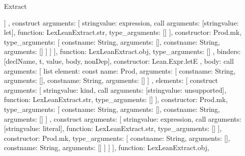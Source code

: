 \begin{lexlean}{Extract}
\begin{toolingmodule}
{{{{{{{                      ]
                    },
                    construct{
                      arguments: [
                        string{value: expression},
                        call{
                          arguments: [string{value: let}],
                          function: LexLeanExtract.str,
                          type_arguments: []
                        }
                      ],
                      constructor: Prod.mk,
                      type_arguments: [
                        const{name: String, arguments: []},
                        const{name: String, arguments: []}
                      ]
                    }
                  ]
                }
              ],
              function: LexLeanExtract.obj,
              type_arguments: []
            },
            binders: [declName, t, value, body, nonDep],
            constructor: Lean.Expr.letE
          },
          {
            body: call{
              arguments: [
                list{
                  element: const{
                    name: Prod,
                    arguments: [
                      const{name: String, arguments: []},
                      const{name: String, arguments: []}
                    ]
                  },
                  elements: [
                    construct{
                      arguments: [
                        string{value: kind},
                        call{
                          arguments: [string{value: unsupported}],
                          function: LexLeanExtract.str,
                          type_arguments: []
                        }
                      ],
                      constructor: Prod.mk,
                      type_arguments: [
                        const{name: String, arguments: []},
                        const{name: String, arguments: []}
                      ]
                    },
                    construct{
                      arguments: [
                        string{value: expression},
                        call{
                          arguments: [string{value: literal}],
                          function: LexLeanExtract.str,
                          type_arguments: []
                        }
                      ],
                      constructor: Prod.mk,
                      type_arguments: [
                        const{name: String, arguments: []},
                        const{name: String, arguments: []}
                      ]
                    }
                  ]
                }
              ],
              function: LexLeanExtract.obj,
}}}}}
\end{toolingmodule}
\end{lexlean}
